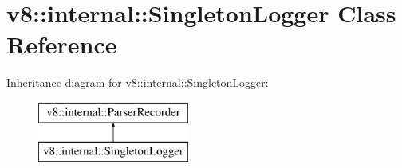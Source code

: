 \hypertarget{classv8_1_1internal_1_1_singleton_logger}{}\section{v8\+:\+:internal\+:\+:Singleton\+Logger Class Reference}
\label{classv8_1_1internal_1_1_singleton_logger}
Inheritance diagram for v8\+:\+:internal\+:\+:Singleton\+Logger\+:\begin{figure}[H]
\begin{center}
\leavevmode
\includegraphics[height=2.000000cm]{classv8_1_1internal_1_1_singleton_logger}
\end{center}
\end{figure}
